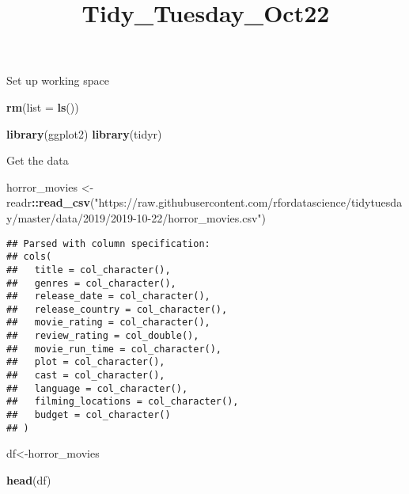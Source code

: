 \documentclass[]{article}
\title{Tidy\_Tuesday\_Oct22}
\author{}
\date{}
\newenvironment{Shaded}{\begin{snugshade}}{\end{snugshade}}
\newcommand{\KeywordTok}[1]{\textcolor[rgb]{0.13,0.29,0.53}{\textbf{#1}}}
\newcommand{\DataTypeTok}[1]{\textcolor[rgb]{0.13,0.29,0.53}{#1}}
\newcommand{\StringTok}[1]{\textcolor[rgb]{0.31,0.60,0.02}{#1}}
\newcommand{\OperatorTok}[1]{\textcolor[rgb]{0.81,0.36,0.00}{\textbf{#1}}}
\newcommand{\NormalTok}[1]{#1}
\begin{document}
\maketitle

Set up working space

\begin{Shaded}
\begin{Highlighting}[]
\KeywordTok{rm}\NormalTok{(}\DataTypeTok{list =} \KeywordTok{ls}\NormalTok{())}
\end{Highlighting}
\end{Shaded}

\begin{Shaded}
\begin{Highlighting}[]
\KeywordTok{library}\NormalTok{(ggplot2)}
\KeywordTok{library}\NormalTok{(tidyr)}
\end{Highlighting}
\end{Shaded}

Get the data

\begin{Shaded}
\begin{Highlighting}[]
\NormalTok{horror_movies <-}\StringTok{ }\NormalTok{readr}\OperatorTok{::}\KeywordTok{read_csv}\NormalTok{(}\StringTok{"https://raw.githubusercontent.com/rfordatascience/tidytuesday/master/data/2019/2019-10-22/horror_movies.csv"}\NormalTok{)}
\end{Highlighting}
\end{Shaded}

\begin{verbatim}
## Parsed with column specification:
## cols(
##   title = col_character(),
##   genres = col_character(),
##   release_date = col_character(),
##   release_country = col_character(),
##   movie_rating = col_character(),
##   review_rating = col_double(),
##   movie_run_time = col_character(),
##   plot = col_character(),
##   cast = col_character(),
##   language = col_character(),
##   filming_locations = col_character(),
##   budget = col_character()
## )
\end{verbatim}

\begin{Shaded}
\begin{Highlighting}[]
\NormalTok{df<-horror_movies}
\end{Highlighting}
\end{Shaded}

\begin{Shaded}
\begin{Highlighting}[]
\KeywordTok{head}\NormalTok{(df)}
\end{Highlighting}
\end{Shaded}
\end{document}
